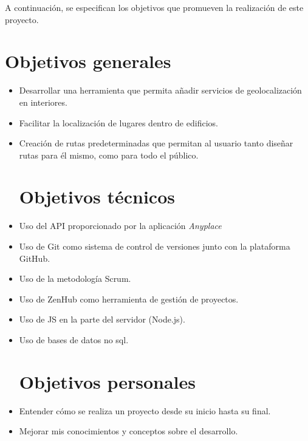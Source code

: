 
A continuación, se especifican los objetivos que promueven la realización
de este proyecto.
\section{Objetivos generales}\label{objetivos-generales}
\begin{itemize}
\item
Desarrollar una herramienta que permita añadir servicios de geolocalización
en interiores.
\item
Facilitar la localización de lugares dentro de edificios.
\item
Creación de rutas predeterminadas que permitan al usuario tanto diseñar rutas para él mismo,
como para todo el público.
\section{Objetivos técnicos}\label{objetivos-tecnicos}
\item
Uso del API proporcionado por la aplicación \textit{Anyplace}
\item
Uso de Git como sistema de control de versiones junto con la plataforma GitHub. 
\item
Uso de la metodología Scrum.
\item 
Uso de ZenHub como herramienta de gestión de proyectos.
\item
Uso de JS en la parte del servidor (Node.js).
\item
Uso de bases de datos no sql.

\section{Objetivos personales}\label{objetivos-personales}
\item
Entender cómo se realiza un proyecto desde su inicio hasta su final.
\item
Mejorar mis conocimientos y conceptos sobre el desarrollo.
\end{itemize}
